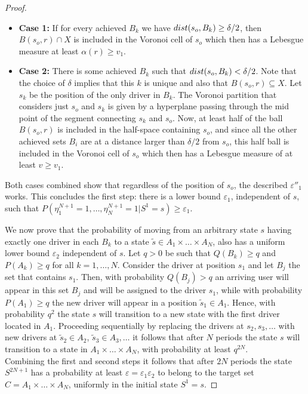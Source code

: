 \documentclass[10pt,a4paper]{amsart}
\begin{document}
\begin{proof}
\begin{itemize}
    \item \textbf{Case 1:} If for every achieved $B_k$ we have $\mathop{\rm dist}(s_o,B_k)\geq\delta/2$, then  $B(s_o,r)\cap X$ is included in the Voronoi cell of $s_o$ which then has  a Lebesgue measure  at least $\alpha(r)\geq v_1$.
     \vspace{-1ex}

    \item \textbf{Case 2:} There is some achieved $B_k$ such that $\mathop{\rm dist}(s_o,B_k)<\delta/2$. Note that the choice of $\delta$ implies that this $k$ is unique and also that 
    $B(s_o,r)
    \subseteq X$.
    Let $s_k$ be the position of the only driver in $B_k$.  The Voronoi partition that considers just  $s_o$ and $s_k$ is given by a hyperplane passing through the mid point of the segment connecting $s_k$ and $s_o$. Now, at least half of the ball 
    $B(s_o,r)$
    is included in the half-space containing $s_o$, and since all the other achieved sets $B_i$ are at a distance larger than $\delta/2$ from $s_o$, this half ball is  included in the Voronoi cell of $s_o$ which then has a Lebesgue measure  of at least $v\geq v_1$.
\end{itemize}
 \vspace{-2ex}

\noindent Both cases combined show that regardless of the position of $s_o$, the described $\varepsilon''_1$ works. This concludes the first step: there is a lower bound $\varepsilon_1$, independent of $s$, such that $P(\eta^{N+1}_1=1,\ldots,\eta^{N+1}_N=1|S^1=s)\geq\varepsilon_1$.


\vspace{1ex}
 We now prove that the probability of moving from an arbitrary state $s$  having exactly one driver in each $B_k$ to a state $\tilde s\in A_1\times\ldots\times A_N$, also has a uniform lower bound $\varepsilon_2$ independent of $s$. 
Let $q>0$ be such that $Q(B_k)\geq q$ and $P(A_k)\geq q$ for all $k=1,\ldots,N$. Consider the driver at position $s_1$ and let  $B_{j}$ the set that contains $s_1$. Then, with probability $Q(B_{j})>q$ an  arriving user will appear in this set $B_j$ and will be assigned to the driver $s_1$, while with probability $P(A_1)\geq q$ the new driver will appear in a position $\tilde s_1\in A_1$.
Hence, with probability $q^2$ the state $s$ will transition to a new state with the first driver located in $A_1$. Proceeding sequentially by replacing the drivers at $s_2,s_3,\ldots$ with new drivers at $\tilde s_2\in A_2$, $\tilde s_3\in A_3, \ldots$
it follows that  after $N$ periods the state $s$ will transition to a state in $A_1\times\ldots\times A_N$, with probability at least $q^{2N}$.
\\[2ex]
Combining the first and second steps it follows that after $2N$ periods the state $S^{2N+1}$ has a probability at least $\varepsilon=\varepsilon_1 \varepsilon_2$ to belong to the target set $C=A_1\times\ldots\times A_N$, uniformly in the initial state $S^1=s$.
\end{proof}
\end{document}
